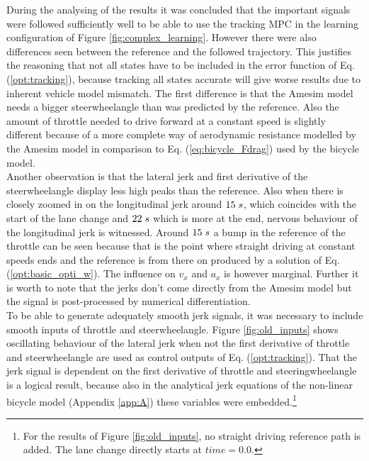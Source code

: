 During the analysing of the results it was concluded that the important signals were followed sufficiently well to be able to use the tracking MPC in the learning configuration of Figure \ref{fig:complex_learning}. However there were also differences seen between the reference and the followed trajectory. This justifies the reasoning that not all states have to be included in the error function of Eq. (\ref{opt:tracking}), because tracking all states accurate will give worse results due to inherent vehicle model mismatch. The first difference is that the Amesim model needs a bigger steerwheelangle than was predicted by the reference. Also the amount of throttle needed to drive forward at a constant speed is slightly different because of a more complete way of aerodynamic resistance modelled by the Amesim model in comparison to Eq. (\ref{eq:bicycle_Fdrag}) used by the bicycle model.\\
Another observation is that the lateral jerk and first derivative of the steerwheelangle display less high peaks than the reference. Also when there is closely zoomed in on the longitudinal jerk around $15\hspace{1mm}s$, which coincides with the start of the lane change and $22\hspace{1mm}s$ which is more at the end, nervous behaviour of the longitudinal jerk is witnessed. Around $15\hspace{1mm}s$ a bump in the reference of the throttle can be seen because that is the point where straight driving at constant speeds ends and the reference is from there on  produced by a solution of Eq. (\ref{opt:basic_opti_w}). The influence on $v_x$ and $a_x$ is however marginal. Further it is worth to note that the jerks don't come directly from the Amesim model but the signal is post-processed by numerical differentiation. \\

To be able to generate adequately smooth jerk signals, it was necessary to include smooth inputs of throttle and steerwheelangle. Figure \ref{fig:old_inputs} shows oscillating behaviour of the lateral jerk when not the first derivative of throttle and steerwheelangle are used as control outputs of Eq. (\ref{opt:tracking}). That the jerk signal is dependent on the first derivative of throttle and steeringwheelangle is a logical result, because also in the analytical jerk equations of the non-linear bicycle model (Appendix \ref{app:A}) these variables were embedded.\footnote{For the results of Figure \ref{fig:old_inputs}, no straight driving reference path is added. The lane change directly starts at $time = 0.0$.}

